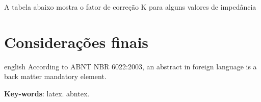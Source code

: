 \documentclass[
	article,			%
	11pt,				%
	oneside,			%
	a4paper,			%
	english,			%
	brazil,				%
	sumario=tradicional
	]{abntex2}
\begin{document}
A tabela abaixo mostra o fator de correção K para alguns valores de
impedância



\section*{Considerações finais}



\postextual



\emptythanks
\maketitle

\renewcommand{\resumoname}{Abstract}
\begin{resumoumacoluna}
 \begin{otherlanguage*}{english}
   According to ABNT NBR 6022:2003, an abstract in foreign language is a back
   matter mandatory element.

   \vspace{\onelineskip}
 
   \noindent
   \textbf{Key-words}: latex. abntex.
 \end{otherlanguage*}  
\end{resumoumacoluna}




%
%


\end{document}
